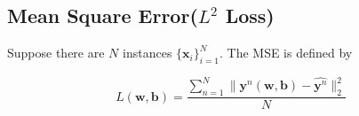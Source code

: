\documentclass{article}
\begin{document}
        \subsection*{Mean Square Error(\texorpdfstring{$L^2$}{L2} Loss)}

            Suppose there are $N$ instances $\{ \boldsymbol{x}_i \}_{i=1}^N$. The MSE is defined by

            \begin{equation*}
                L(\boldsymbol{w},\boldsymbol{b}) = \frac{\sum_{n=1}^N \|
                \boldsymbol{y}^n(\boldsymbol{w},\boldsymbol{b}) -
                \hat{\boldsymbol{y}^n}\|_2^2}{N}
            \end{equation*}
\end{document}
